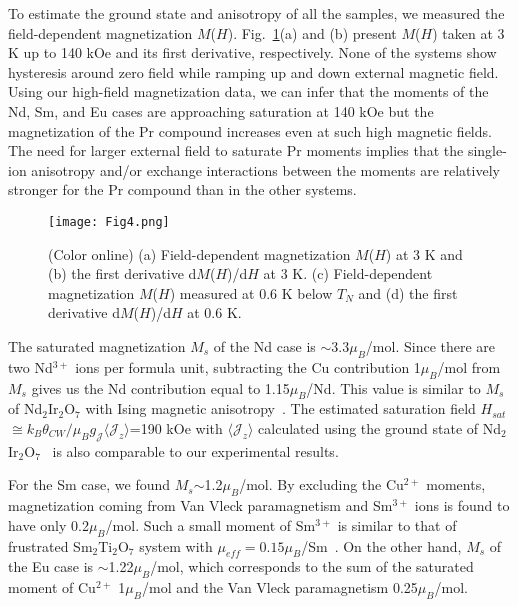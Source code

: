 \documentclass[aps,prl,reprint,amsmath,amssymb,superscriptaddress,showpacs]{revtex4-1}
\begin{document}
To estimate the ground state and anisotropy of all the samples, we measured the field-dependent magnetization $M$($H$). Fig.~\ref{fig4}(a) and (b) present $M$($H$) taken at 3 K up to 140 kOe and its first derivative, respectively. None of the systems show hysteresis around zero field while ramping up and down external magnetic field. Using our high-field magnetization data, we can infer that the moments of the Nd, Sm, and Eu cases are approaching saturation at 140 kOe but the magnetization of the Pr compound increases even at such high magnetic fields. The need for larger external field to saturate Pr moments implies that the single-ion anisotropy and/or exchange interactions between the moments are relatively stronger for the Pr compound than in the other systems.

\begin{figure}[t]
\texttt{[image: Fig4.png]}
\caption{\label{fig4}(Color online) (a) Field-dependent magnetization $M$($H$) at 3 K and (b) the first derivative d$M$($H$)/d$H$ at 3 K. (c) Field-dependent magnetization $M$($H$) measured at 0.6 K below $T_N$ and (d) the first derivative d$M$($H$)/d$H$ at 0.6 K.}
\end{figure}

The saturated magnetization $M_s$ of the Nd case is $\sim$3.3$\mu_{B}$/mol. Since there are two Nd$^{3+}$ ions per formula unit, subtracting the Cu contribution 1$\mu_{B}$/mol from $M_s$ gives us the Nd contribution equal to 1.15$\mu_{B}$/Nd. This value is similar to $M_s$ of Nd$_2$Ir$_2$O$_7$ with Ising magnetic anisotropy~\cite{Z.Tian2016}. The estimated saturation field $H_{sat}$$\cong$$k_B\theta_{CW}/\mu_{B}g_{\mathcal{J}}\langle\mathcal{J}_z\rangle$=190 kOe with $\langle\mathcal{J}_z\rangle$ calculated using the ground state of Nd$_2$Ir$_2$O$_7$~\cite{M.Watahiki2011} is also comparable to our experimental results.

For the Sm case, we found $M_s$$\sim$1.2$\mu_{B}$/mol. By excluding the Cu$^{2+}$ moments, magnetization coming from Van Vleck paramagnetism and Sm$^{3+}$ ions is found to have only 0.2$\mu_{B}$/mol. Such a small moment of Sm$^{3+}$ is similar to that of frustrated Sm$_2$Ti$_2$O$_7$ system with $\mu_{eff}=0.15\mu_{B}$/Sm~\cite{S.Singh2008}. On the other hand, $M_s$ of the Eu case is $\sim$1.22$\mu_{B}$/mol, which corresponds to the sum of the saturated moment of Cu$^{2+}$ 1$\mu_{B}$/mol and the Van Vleck paramagnetism 0.25$\mu_{B}$/mol. 
\end{document}
